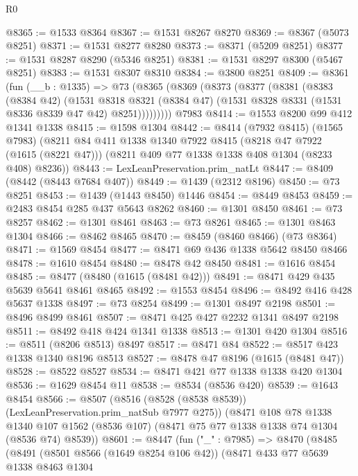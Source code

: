 \begin{lexlean}{R0}
\begin{coremodule}
@8365 := @1533 @8364
@8367 := @1531 @8267 @8270
@8369 := @8367 (@5073 @8251)
@8371 := @1531 @8277 @8280
@8373 := @8371 (@5209 @8251)
@8377 := @1531 @8287 @8290 (@5346 @8251)
@8381 := @1531 @8297 @8300 (@5467 @8251)
@8383 := @1531 @8307 @8310
@8384 := @3800 @8251
@8409 := @8361
    (fun (__b : @1335) =>
    @73
      (@8365
        (@8369
          (@8373
            (@8377
              (@8381
                (@8383
                  (@8384 @42)
                  (@1531
                    @8318
                    @8321
                    (@8384 @47)
                    (@1531 @8328 @8331 (@1531 @8336 @8339 @47 @42) @8251)))))))))
    @7983
@8414 := @1553 @8200 @99 @412 @1341 @1338
@8415 := @1598 @1304
@8442 := @8414
    (@7932 @8415)
    (@1565 @7983)
    (@8211
      @84
      @411
      @1338
      @1340
      @7922
      @8415
      (@8218 @47 @7922 (@1615 (@8221 @47)))
      (@8211 @409 @77 @1338 @1338 @408 @1304 (@8233 @408) @8236))
@8443 := LexLeanPreservation.prim_natLt
@8447 := @8409 (@8442 (@8443 @7684 @407))
@8449 := @1439 (@2312 @8196)
@8450 := @73 @8251
@8453 := @1439 (@1443 @8450) @1446
@8454 := @8449 @8453
@8459 := @2483 @8454 @285 @437 @5643 @8262
@8460 := @1301 @8450
@8461 := @73 @8257
@8462 := @1301 @8461
@8463 := @73 @8261
@8465 := @1301 @8463 @1304
@8466 := @8462 @8465
@8470 := @8459 (@8460 @8466) (@73 @8364)
@8471 := @1569 @8454
@8477 := @8471 @69 @436 @1338 @5642 @8450 @8466
@8478 := @1610 @8454
@8480 := @8478 @42 @8450
@8481 := @1616 @8454
@8485 := @8477 (@8480 (@1615 (@8481 @42)))
@8491 := @8471 @429 @435 @5639 @5641 @8461 @8465
@8492 := @1553 @8454
@8496 := @8492 @416 @428 @5637 @1338
@8497 := @73 @8254
@8499 := @1301 @8497 @2198
@8501 := @8496 @8499 @8461
@8507 := @8471 @425 @427 @2232 @1341 @8497 @2198
@8511 := @8492 @418 @424 @1341 @1338
@8513 := @1301 @420 @1304
@8516 := @8511 (@8206 @8513) @8497
@8517 := @8471 @84
@8522 := @8517 @423 @1338 @1340 @8196 @8513
@8527 := @8478 @47 @8196 (@1615 (@8481 @47))
@8528 := @8522 @8527
@8534 := @8471 @421 @77 @1338 @1338 @420 @1304
@8536 := @1629 @8454 @11
@8538 := @8534 (@8536 @420)
@8539 := @1643 @8454
@8566 := @8507
    (@8516 (@8528 (@8538 @8539)) (LexLeanPreservation.prim_natSub @7977 @275))
    (@8471
      @108
      @78
      @1338
      @1340
      @107
      @1562
      (@8536 @107)
      (@8471 @75 @77 @1338 @1338 @74 @1304 (@8536 @74) @8539))
@8601 := @8447
    (fun ("_" : @7985) =>
    @8470
      (@8485
        (@8491
          (@8501 @8566 (@1649 @8254 @106 @42))
          (@8471
            @433
            @77
            @5639
            @1338
            @8463
            @1304

\end{coremodule}
\end{lexlean}

